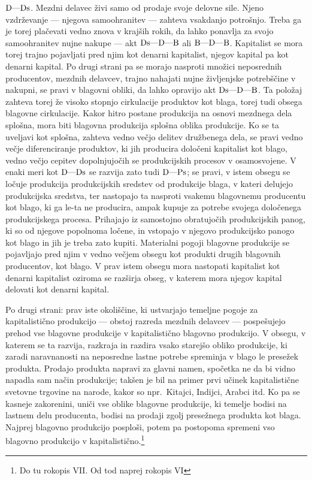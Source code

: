 \documentclass[kapital_02.tex]{subfiles}
\begin{document}
\( \textrm{D}\textrm{---}\textrm{Ds} \). Mezdni delavec živi samo od prodaje svoje delovne sile. Njeno vzdrževanje --- njegova samoohranitev --- zahteva vsakdanjo potrošnjo. Treba ga je torej plačevati vedno znova v krajših rokih, da lahko ponavlja za svojo samoohranitev nujne nakupe --- akt \( \textrm{Ds}\textrm{---}\textrm{D}\textrm{---}\textrm{B} \) ali \( \textrm{B}\textrm{---}\textrm{D}\textrm{---}\textrm{B} \). Kapitalist se mora torej trajno pojavljati pred njim kot denarni kapitalist, njegov kapital pa kot denarni kapital. Po drugi strani pa se morajo nasproti množici neposrednih producentov, mezdnih delavcev, trajno nahajati nujne življenjske potrebščine v nakupni, se pravi v blagovni obliki, da lahko opravijo akt \( \textrm{Ds}\textrm{---}\textrm{D}\textrm{---}\textrm{B} \). Ta položaj zahteva torej že visoko stopnjo cirkulacije produktov kot blaga, torej tudi obsega blagovne cirkulacije. Kakor hitro postane produkcija na osnovi mezdnega dela splošna, mora biti blagovna produkcija splošna oblika produkcije. Ko se ta uveljavi kot splošna, zahteva vedno večjo delitev družbenega dela, se pravi vedno večje diferenciranje produktov, ki jih producira določeni kapitalist kot blago, vedno večjo cepitev dopolnjujočih se produkcijskih procesov v osamosvojene. V enaki meri kot \( \textrm{D}\textrm{---}\textrm{Ds} \) se razvija zato tudi \( \textrm{D}\textrm{---}\textrm{Ps} \); se pravi, v istem obsegu se ločuje produkcija produkcijskih sredstev od produkcije blaga, v kateri delujejo produkcijska sredstva, ter nastopajo ta nasproti vsakemu blagovnemu producentu kot blago, ki ga le-ta ne producira, ampak kupuje za potrebe svojega določenega produkcijskega procesa. Prihajajo iz samostojno obratujočih produkcijskih panog, ki so od njegove popolnoma ločene, in vstopajo v njegovo produkcijsko panogo kot blago in jih je treba zato kupiti. Materialni pogoji blagovne produkcije se pojavljajo pred njim v vedno večjem obsegu kot produkti drugih blagovnih producentov, kot blago. V prav istem obsegu mora nastopati kapitalist kot denarni kapitalist oziroma se razširja obseg, v katerem mora njegov kapital delovati kot denarni kapital.

Po drugi strani: prav iste okoliščine, ki ustvarjajo temeljne pogoje za kapitalistično produkcijo --- obstoj razreda mezdnih delavcev --- pospešujejo prehod vse blagovne produkcije v kapitalistično blagovno produkcijo. V obsegu, v katerem se ta razvija, razkraja in razdira vsako starejšo obliko produkcije, ki zaradi naravnanosti na neposredne lastne potrebe spreminja v blago le presežek produkta. Prodajo produkta napravi za glavni namen, spočetka ne da bi vidno napadla sam način produkcije; takšen je bil na primer prvi učinek kapitalistične svetovne trgovine na narode, kakor so npr.\ Kitajci, Indijci, Arabci itd. Ko pa se kasneje zakorenini, uniči vse oblike blagovne produkcije, ki temelje bodisi na lastnem delu producenta, bodisi na prodaji zgolj presežnega produkta kot blaga. Najprej blagovno produkcijo posploši, potem pa postopoma spremeni vso blagovno produkcijo v kapitalistično.\footnote{Do tu rokopis VII. Od tod naprej rokopis VI}
\end{document}
